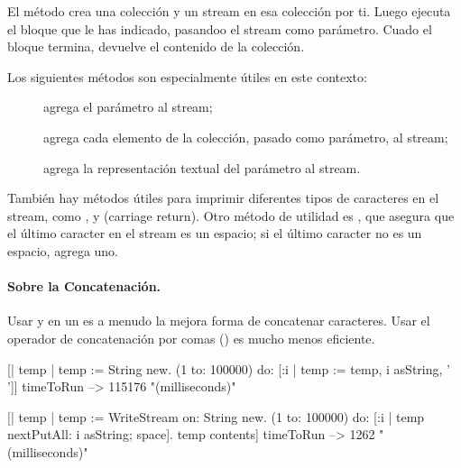 \documentclass[a4paper,10pt,twoside]{book}
\begin{document}
{
El m\'etodo   crea una colecci\'on y un stream
en esa colecci\'on por ti. Luego ejecuta el bloque que le has indicado, pasandoo el stream como par\'ametro. Cuado el bloque
termina,  devuelve el contenido de la colecci\'on.

Los siguientes m\'etodos  son especialmente \'utiles en este contexto:

\begin{description}
\item[] agrega el par\'ametro al stream;
\item[] agrega cada elemento de la colecci\'on, pasado como par\'ametro, al stream;
\item[] agrega la representaci\'on textual del par\'ametro al stream.
\end{description}

Tambi\'en hay m\'etodos \'utiles para imprimir diferentes tipos de caracteres en el stream, 
como ,  y  (carriage return).
Otro m\'etodo de utilidad es , que asegura que el \'ultimo caracter
en el stream es un espacio; si el \'ultimo caracter no es un espacio, agrega uno. 

\paragraph{Sobre la Concatenaci\'on.}
Usar  y  en un  es a menudo la mejora forma de concatenar caracteres. Usar el operador de concatenaci\'on por comas (\ct{,}) es mucho menos eficiente. 

\begin{code}{}
[| temp |
  temp := String new.
  (1 to: 100000)
    do: [:i | temp := temp, i asString, ' ']] timeToRun --> 115176 "(milliseconds)"

[| temp |
  temp := WriteStream on: String new.
  (1 to: 100000)
    do: [:i | temp nextPutAll: i asString; space].
  temp contents] timeToRun --> 1262 "(milliseconds)"
\end{code}

}
\end{document}
